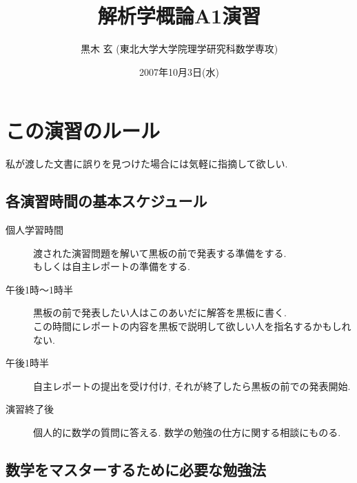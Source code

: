 \documentclass[12pt,twoside]{jarticle}
\newcommand\commentout[1]{#1}
\newcommand\commentout[1]{}
\begin{document}
\title{\bf 解析学概論A1演習
}
\author{黒木 玄 \quad (東北大学大学院理学研究科数学専攻)}
\date{2007年10月3日(水)}
\maketitle
\tableofcontents
\setcounter{section}{-1}

\section{この演習のルール}


私が渡した文書に誤りを見つけた場合には気軽に指摘して欲しい.

\subsection{各演習時間の基本スケジュール}

\begin{description}
 \item[個人学習時間]
  渡された演習問題を解いて黒板の前で発表する準備をする. \\
  もしくは自主レポートの準備をする.
 \item[午後1時〜1時半] 
  黒板の前で発表したい人はこのあいだに解答を黒板に書く. \\
  この時間にレポートの内容を黒板で説明して欲しい人を指名するかもしれない.
 \item[午後1時半]
  自主レポートの提出を受け付け, それが終了したら黒板の前での発表開始.
 \item[演習終了後]
  個人的に数学の質問に答える. 
  数学の勉強の仕方に関する相談にものる.
\end{description}

\subsection{数学をマスターするために必要な勉強法}
\end{document}
